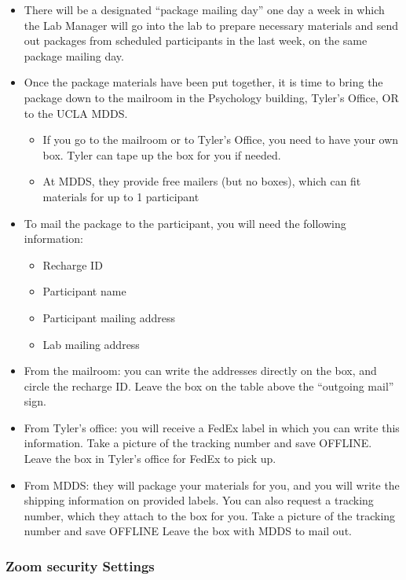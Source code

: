 \documentclass[]{book}
\providecommand{\tightlist}{%
  \setlength{\itemsep}{0pt}\setlength{\parskip}{0pt}}
\begin{document}
\begin{itemize}
\tightlist
\item
  There will be a designated ``package mailing day'' one day a week in which the Lab Manager will go into the lab to prepare necessary materials and send out packages from scheduled participants in the last week, on the same package mailing day.
\item
  Once the package materials have been put together, it is time to bring the package down to the mailroom in the Psychology building, Tyler's Office, OR to the UCLA MDDS.

  \begin{itemize}
  \tightlist
  \item
    If you go to the mailroom or to Tyler's Office, you need to have your own box. Tyler can tape up the box for you if needed.
  \item
    At MDDS, they provide free mailers (but no boxes), which can fit materials for up to 1 participant
  \end{itemize}
\item
  To mail the package to the participant, you will need the following information:

  \begin{itemize}
  \tightlist
  \item
    Recharge ID
  \item
    Participant name
  \item
    Participant mailing address
  \item
    Lab mailing address
  \end{itemize}
\item
  From the mailroom: you can write the addresses directly on the box, and circle the recharge ID. Leave the box on the table above the ``outgoing mail'' sign.
\item
  From Tyler's office: you will receive a FedEx label in which you can write this information. Take a picture of the tracking number and save OFFLINE. Leave the box in Tyler's office for FedEx to pick up.
\item
  From MDDS: they will package your materials for you, and you will write the shipping information on provided labels. You can also request a tracking number, which they attach to the box for you. Take a picture of the tracking number and save OFFLINE Leave the box with MDDS to mail out.
\end{itemize}

\hypertarget{zoom-security-settings}{%
\subsubsection{Zoom security Settings}\label{zoom-security-settings}}
\end{document}
